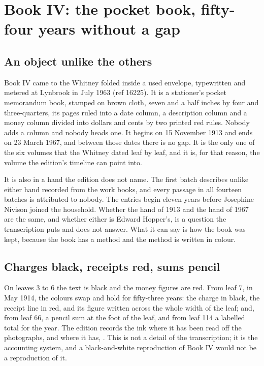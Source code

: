 \chapter{Book IV: the pocket book, fifty-four years without a gap}

\section{An object unlike the others}

Book IV came to the Whitney folded inside a used envelope, typewritten  and metered at Lynbrook in July 1963 (ref 16225). It is a stationer's pocket memorandum book,  stamped on brown cloth, seven and a half inches by four and three-quarters, its pages ruled into a date column, a description column and a money column divided into dollars and cents by two printed red rules. Nobody adds a column and nobody heads one. It begins on 15 November 1913 and ends on 23 March 1967, and between those dates there is no gap. It is the only one of the six volumes that the Whitney dated leaf by leaf, and it is, for that reason, the volume the edition's timeline can point into.

It is also in a hand the edition does not name. The first batch describes  unlike either hand recorded from the work books, and every passage in all fourteen batches is attributed to nobody. The entries begin eleven years before Josephine Nivison joined the household. Whether the hand of 1913 and the hand of 1967 are the same, and whether either is Edward Hopper's, is a question the transcription puts and does not answer. What it can say is how the book was kept, because the book has a method and the method is written in colour.

\section{Charges black, receipts red, sums pencil}

On leaves 3 to 6 the text is black and the money figures are red. From leaf 7, in May 1914, the colours swap and hold for fifty-three years: the charge in black, the receipt line in red,  and its figure written across the whole width of the leaf; and, from leaf 66, a pencil sum at the foot of the leaf, and from leaf 114 a labelled total for the year. The edition records the ink where it has been read off the photographs, and where it has, . This is not a detail of the transcription; it is the accounting system, and a black-and-white reproduction of Book IV would not be a reproduction of it.

